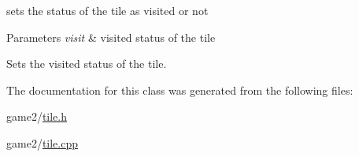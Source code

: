 sets the status of the tile as visited or not 


\begin{DoxyParams}{\-Parameters}
{\em visit} & visited status of the tile\\
\hline
\end{DoxyParams}
\-Sets the visited status of the tile. 

\-The documentation for this class was generated from the following files\-:\begin{DoxyCompactItemize}
\item 
game2/\hyperlink{tile_8h}{tile.\-h}\item 
game2/\hyperlink{tile_8cpp}{tile.\-cpp}\end{DoxyCompactItemize}
